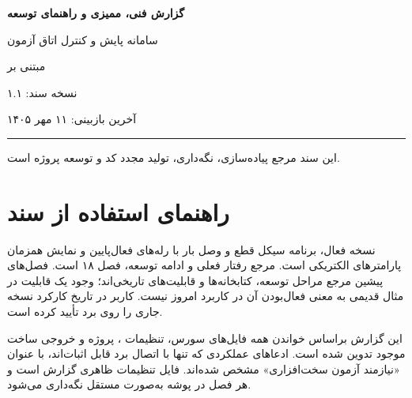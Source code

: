 \begin{titlepage}
\centering
\vspace*{25mm}
{\color{ReportPrimary}\Huge\bfseries گزارش فنی، ممیزی و راهنمای توسعه\par}
\vspace{8mm}
{\LARGE سامانه پایش و کنترل اتاق آزمون\par}
\vspace{5mm}
{\Large مبتنی بر
\par}
\vfill
{\large نسخه سند: ۱.۱\par}
{\large آخرین بازبینی: ۱۱ مهر ۱۴۰۵\par}
\vspace{15mm}
{\color{ReportSecondary}\rule{0.75\textwidth}{1pt}\par}
\vspace{5mm}
این سند مرجع پیاده‌سازی، نگه‌داری، تولید مجدد کد و توسعه پروژه است.
\end{titlepage}

\chapter*{راهنمای استفاده از سند}
نسخه فعال، برنامه سیکل قطع و وصل بار با رله‌های فعال‌پایین و نمایش همزمان پارامترهای الکتریکی است. مرجع رفتار فعلی و ادامه توسعه، فصل ۱۸ است. فصل‌های پیشین مرجع مراحل توسعه، کتابخانه‌ها و قابلیت‌های تاریخی‌اند؛ وجود یک قابلیت در مثال قدیمی به معنی فعال‌بودن آن در کاربرد امروز نیست. کاربر در تاریخ  کارکرد نسخه جاری را روی برد تأیید کرده است.

این گزارش براساس خواندن همه فایل‌های سورس، تنظیمات
، پروژه
و خروجی ساخت موجود تدوین شده است. ادعاهای عملکردی که تنها با اتصال برد قابل اثبات‌اند، با عنوان «نیازمند آزمون سخت‌افزاری» مشخص شده‌اند. فایل تنظیمات ظاهری گزارش
است و هر فصل در پوشه
به‌صورت مستقل نگه‌داری می‌شود.
